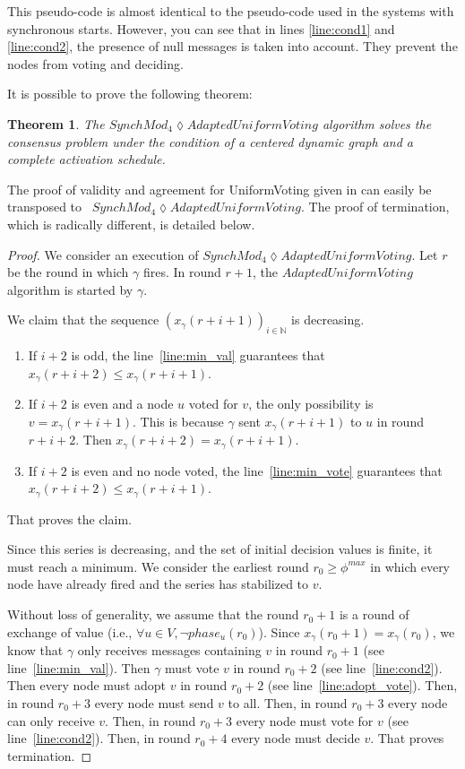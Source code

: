 \documentclass[11pt,letterpaper]{article}
\newtheorem{thm}{Theorem}
\newcommand{\cent}{\gamma}
\newcommand{\edmargin}[2]{\marginpar{\raggedright\linespread{.7}\footnotesize #1: #2}}
\begin{document}
This pseudo-code is almost identical to the pseudo-code used in the systems with synchronous starts.
However, you can see\edmargin{sm}{do not address the reader} that in lines \ref{line:cond1} and \ref{line:cond2}, the presence of null messages is taken into account.
They prevent the nodes from voting and deciding.

It is possible to prove the following theorem:

\begin{thm}
	The $SynchMod_4 \lozenge AdaptedUniformVoting$ algorithm solves the consensus problem under the condition of a centered dynamic graph and a complete activation schedule.
\end{thm}

The proof of validity and agreement for UniformVoting given in \cite{CBS09} can easily be transposed to \newline~$SynchMod_4 \lozenge AdaptedUniformVoting$.
The proof of termination, which is radically different, is detailed below.

\begin{proof}
	We consider an execution of $SynchMod_4 \lozenge AdaptedUniformVoting$.
	Let $r$ be the round in which $\cent$ fires.
	In round $r+1$, the $AdaptedUniformVoting$ algorithm is started by $\cent$.

	We claim that the sequence $(x_\cent(r+i+1))_{i \in \mathds{N}}$ is decreasing.
	\begin{enumerate}
		\item If $i+2$ is odd, the line~\ref{line:min_val} guarantees that $x_\cent(r+i+2) \leq x_\cent(r+i+1)$.
		\item If $i+2$ is even and a node $u$ voted for $v$, the only possibility is $v = x_\cent(r+i+1)$. This is because $\cent$ sent $x_\cent(r+i+1)$ to $u$ in round $r+i+2$.
			Then $x_\cent(r+i+2) = x_\cent(r+i+1)$.
		\item If $i+2$ is even and no node voted, the line~\ref{line:min_vote} guarantees that $x_\cent(r+i+2) \leq x_\cent(r+i+1)$.
	\end{enumerate}
	That proves the claim.

	Since this series is decreasing, and the set of initial decision values is finite, it must reach a minimum.
	We consider the earliest round $r_0 \geq \phi^{max}$ in which every node have already fired and the series has stabilized to $v$.

	Without loss of generality, we assume that the round $r_0+1$ is a round of exchange of value (i.e., $\forall u \in V, \neg phase_u(r_0)$).
	Since $x_\cent(r_0+1) = x_\cent(r_0)$, we know that $\cent$ only receives messages containing $v$ in round $r_0+1$ (see line~\ref{line:min_val}).
	Then $\cent$ must vote $v$ in round $r_0+2$ (see line~\ref{line:cond2}).
	Then every node must adopt $v$ in round $r_0+2$ (see line~\ref{line:adopt_vote}).
	Then, in round $r_0+3$ every node must send $v$ to all.
	Then, in round $r_0+3$ every node can only receive $v$.
	Then, in round $r_0+3$ every node must vote for $v$ (see line~\ref{line:cond2}).
	Then, in round $r_0+4$ every node must decide $v$.
	That proves termination.
\end{proof}
\end{document}
